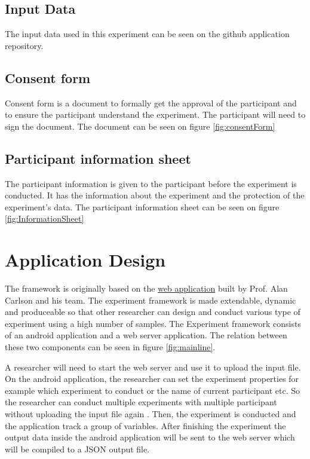 \subsection{Input Data}
The input data used in this experiment can be seen on the github application repository.

\subsection{Consent form}
Consent form is a document to formally get the approval of the participant and to ensure the participant understand the experiment. The participant will need to sign the document. The document can be seen on figure \ref{fig:consentForm}
\subsection{Participant information sheet}
The participant information is given to the participant before the experiment is conducted. It has the information about the experiment and the protection of the experiment's data. The participant information sheet can be seen on figure \ref{fig:InformationSheet}

\section{Application Design}

The framework is originally based on the \href{https://pennstate.qualtrics.com/jfe/form/SV_dpaKW6wlA1Fr7BX}
{web application} built by Prof. Alan Carlson and his team. The experiment framework is made extendable, dynamic and produceable so that other researcher can design and conduct various type of experiment using a high number of samples.
 The Experiment framework consists of an android application and a web server application.
 The relation between these two components can be seen in figure \ref{fig:mainline}.

 A researcher will need to start the web server and use it to upload the input file.
 On the android application, the researcher can set the experiment properties for example which experiment to conduct or the name of current participant etc.
 So the researcher can conduct multiple experiments with multiple participant without uploading the input file again
 . Then, the experiment is conducted and the application track a group of variables.
 After finishing the experiment the output data inside the android application will be sent to the web server which will be compiled to a JSON output file.

